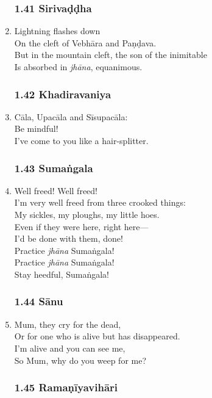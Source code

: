 \documentclass[10pt, openany]{book}
\begin{document}
\begin{enumerate}
\subsubsection*{1.41 Sirivaḍḍha}

\item Lightning flashes down\\
On the cleft of Vebhāra and Paṇḍava.\\
But in the mountain cleft, the son of the inimitable\\
Is absorbed in \emph{jhāna}, equanimous.

\subsubsection*{1.42 Khadiravaniya}

\item Cāla, Upacāla and Sīsupacāla:\\
Be mindful!\\
I’ve come to you like a hair-splitter.

\subsubsection*{1.43 Sumaṅgala}

\item Well freed! Well freed!\\
I’m very well freed from three crooked things:\\
My sickles, my ploughs, my little hoes.\\
Even if they were here, right here—\\
I’d be done with them, done!\\
Practice \emph{jhāna} Sumaṅgala!\\
Practice \emph{jhāna}  Sumaṅgala!\\
Stay heedful, Sumaṅgala!

\subsubsection*{1.44 Sānu}

\item Mum, they cry for the dead,\\
Or for one who is alive but has disappeared.\\
I’m alive and you can see me,\\
So Mum, why do you weep for me?

\subsubsection*{1.45 Ramaṇīyavihāri}


\end{enumerate}
\end{document}

